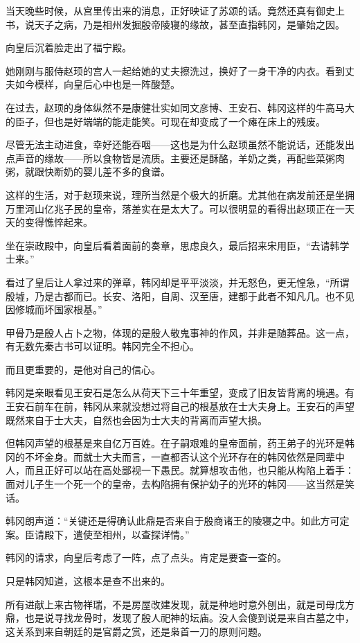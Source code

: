 当天晚些时候，从宫里传出来的消息，正好映证了苏颂的话。竟然还真有御史上书，说天子之病，乃是相州发掘殷帝陵寝的缘故，甚至直指韩冈，是肇始之因。

向皇后沉着脸走出了福宁殿。

她刚刚与服侍赵顼的宫人一起给她的丈夫擦洗过，换好了一身干净的内衣。看到丈夫如今模样，向皇后心中也是一阵酸楚。

在过去，赵顼的身体纵然不是康健壮实如同文彦博、王安石、韩冈这样的牛高马大的臣子，但也是好端端的能走能笑。可现在却变成了一个瘫在床上的残废。

尽管无法主动进食，幸好还能吞咽——这也是为什么赵顼虽然不能说话，还能发出点声音的缘故——所以食物皆是流质。主要还是酥酪，羊奶之类，再配些菜粥肉粥，就跟快断奶的婴儿差不多的食谱。

这样的生活，对于赵顼来说，理所当然是个极大的折磨。尤其他在病发前还是坐拥万里河山亿兆子民的皇帝，落差实在是太大了。可以很明显的看得出赵顼正在一天天的变得憔悴起来。

坐在崇政殿中，向皇后看着面前的奏章，思虑良久，最后招来宋用臣，“去请韩学士来。”

看过了皇后让人拿过来的弹章，韩冈却是平平淡淡，并无怒色，更无惶急，“所谓殷墟，乃是古都而已。长安、洛阳，自周、汉至唐，建都于此者不知凡几。也不见因修城而坏国家根基。”

甲骨乃是殷人占卜之物，体现的是殷人敬鬼事神的作风，并非是随葬品。这一点，有无数先秦古书可以证明。韩冈完全不担心。

而且更重要的，是他对自己的信心。

韩冈是亲眼看见王安石是怎么从荷天下三十年重望，变成了旧友皆背离的境遇。有王安石前车在前，韩冈从来就没想过将自己的根基放在士大夫身上。王安石的声望既然来自于士大夫，自然也会因为士大夫的背离而声望大损。

但韩冈声望的根基是来自亿万百姓。在子嗣艰难的皇帝面前，药王弟子的光环是韩冈的不坏金身。而就士大夫而言，一直都否认这个光环存在的韩冈依然是同辈中人，而且正好可以站在高处鄙视一下愚民。就算想攻击他，也只能从构陷上着手：面对儿子生一个死一个的皇帝，去构陷拥有保护幼子的光环的韩冈——这当然是笑话。

韩冈朗声道：“关键还是得确认此鼎是否来自于殷商诸王的陵寝之中。如此方可定案。臣请殿下，遣使至相州，以查探详情。”

韩冈的请求，向皇后考虑了一阵，点了点头。肯定是要查一查的。

只是韩冈知道，这根本是查不出来的。

所有进献上来古物祥瑞，不是房屋改建发现，就是种地时意外刨出，就是司母戊方鼎，也是说寻找龙骨时，发现了殷人祀神的坛庙。没人会傻到说是来自古墓之中，这关系到来自朝廷的是官爵之赏，还是枭首一刀的原则问题。

